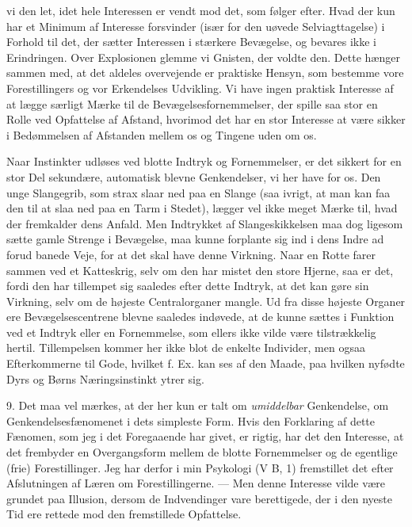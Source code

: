 \documentclass[12pt,a4paper,openany]{book}
\newcommand{\opage}[1]{\marginnote{\footnotesize\textit{[#1]}}}
\begin{document}
vi den let, idet hele Interessen er vendt mod det, som følger efter. Hvad der
kun har et Minimum af Interesse forsvinder (især for den uøvede
Selviagttagelse) i Forhold til det, der sætter Interessen i stærkere Bevægelse,
og bevares ikke i Erindringen. Over Explosionen glemme vi Gnisten, der voldte
den. Dette hænger sammen med, at det aldeles overvejende er praktiske Hensyn,
som bestemme vore Forestillingers og vor Erkendelses Udvikling. Vi have ingen
praktisk Interesse af at lægge særligt Mærke til de Bevægelsesfornemmelser, der
spille saa stor en Rolle ved Opfattelse af Afstand, hvorimod det har en stor
Interesse at være sikker i Bedømmelsen af Afstanden mellem os og Tingene uden om os.

Naar Instinkter udløses ved blotte Indtryk og Fornemmelser, er det sikkert for
en stor Del sekundære, automatisk blevne Genkendelser, vi her have for os. Den
unge Slangegrib, som strax slaar ned paa en Slange (saa ivrigt, at man kan faa
den til at slaa ned paa en Tarm i Stedet), lægger vel ikke meget Mærke til,
hvad der fremkalder dens Anfald. Men Indtrykket af Slangeskikkelsen maa dog
ligesom sætte gamle Strenge i Bevægelse, maa kunne forplante sig ind i dens
Indre ad forud banede Veje, for at det skal have denne Virkning. Naar en Rotte
farer sammen ved et Katteskrig, selv om den har mistet den store Hjerne, saa er
det, fordi den har tillempet sig saaledes efter dette Indtryk, at det kan gøre
sin Virkning, selv om de højeste Centralorganer mangle. Ud fra disse højeste
Organer ere Bevægelsescentrene blevne saaledes indøvede, at de kunne sættes i
Funktion ved et Indtryk eller en Fornemmelse, som ellers ikke vilde være
tilstrækkelig hertil. Tillempelsen kommer her ikke blot de enkelte Individer,
men ogsaa Efterkommerne til Gode, hvilket f. Ex. kan ses af den Maade, paa
hvilken nyfødte Dyrs og Børns Næringsinstinkt ytrer sig.

\setcounter{footnote}{0}%
\opage{18}9. Det maa vel mærkes, at der her kun er talt om \emph{umiddelbar}
Genkendelse, om Genkendelsesfænomenet i dets simpleste Form. Hvis den
Forklaring af dette Fænomen, som jeg i det Foregaaende har givet, er rigtig,
har det den Interesse, at det frembyder en Overgangsform mellem de blotte
Fornemmelser og de egentlige (frie) Forestillinger. Jeg har derfor i min
Psykologi (V B, 1) fremstillet det efter Afslutningen af Læren om
Forestillingerne. --- Men denne Interesse vilde være grundet paa Illusion,
dersom de Indvendinger vare berettigede, der i den nyeste Tid ere rettede mod
den fremstillede Opfattelse.
\end{document}
